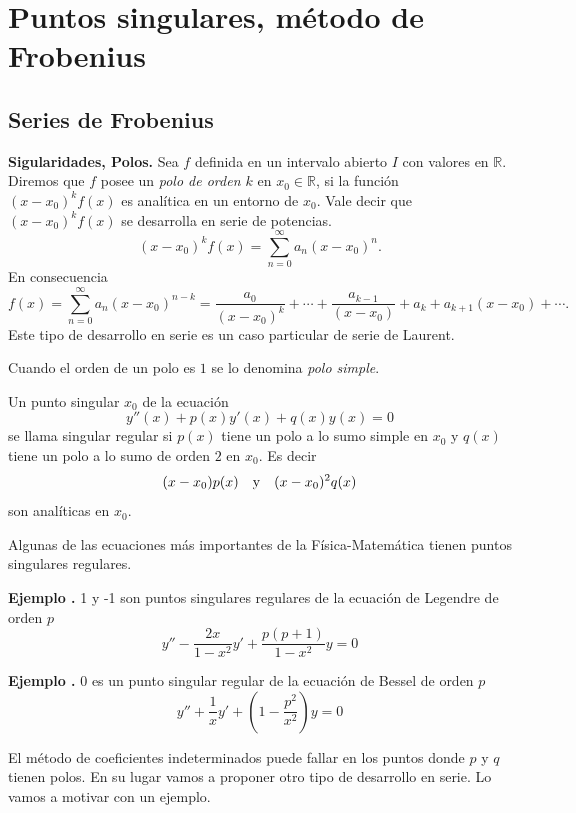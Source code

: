 \documentclass{article}
\newcommand{\rr}{\mathbb{R}}
\newcounter{ejemplo_cont}
\newenvironment{ejemplo}{\noindent\textbf{Ejemplo  \arabic{ejemplo_cont}.} }{\addtocounter{ejemplo_cont}{1}}
\begin{document}
\section{Puntos singulares, método de Frobenius}

\subsection{Series de Frobenius}
\begin{definicion}\textbf{ Sigularidades, Polos.} Sea $f$ definida en un intervalo abierto $I$ con valores en $\rr$. Diremos que $f$ posee un \emph{polo de orden $k$} en $x_0\in\rr$, si la función $(x-x_0)^kf(x)$ es analítica en un entorno de $x_0$. Vale decir que $(x-x_0)^kf(x)$ se desarrolla en serie de potencias.
\[(x-x_0)^kf(x)=\sum_{n=0}^{\infty}a_n(x-x_0)^n.\]
En consecuencia
\[f(x)=\sum_{n=0}^{\infty}a_n(x-x_0)^{n-k}=\frac{a_0}{(x-x_0)^k}+\cdots+\frac{a_{k-1}}{(x-x_0)}+a_k+a_{k+1}(x-x_0)+\cdots.\]
Este tipo de desarrollo en serie es un caso particular de serie de Laurent. 

Cuando el orden de un polo es $1$ se lo denomina \emph{polo simple}.
\end{definicion}



\begin{definicion} Un punto singular $x_0$ de la ecuación
\[y''(x)+p(x)y'(x)+q(x)y(x)=0\]
se llama singular regular si $p(x)$ tiene un polo a lo sumo simple en $x_0$ y $q(x)$ tiene un polo a lo sumo de orden $2$ en $x_0$. Es decir
\[(x-x_0)p(x)\quad\hbox{y}\quad (x-x_0)^2q(x)\]
son analíticas en $x_0$.
\end{definicion}
Algunas de las ecuaciones más importantes de la Física-Matemática tienen puntos singulares regulares.

\begin{ejemplo} 1 y -1 son puntos singulares regulares de la ecuación de Legendre de orden $p$
\[y''-\frac{2x}{1-x^2}y'+\frac{p(p+1)}{1-x^2}y=0\]
\end{ejemplo}


\begin{ejemplo} 0 es un punto singular regular de la ecuación de Bessel de orden $p$
\[y''+\frac{1}{x}y'+\left(1-\frac{p^2}{x^2}\right)y=0\]
\end{ejemplo}

El método de coeficientes indeterminados puede fallar en los puntos donde $p$ y $q$ tienen polos. En su lugar vamos a proponer otro tipo de desarrollo en serie. Lo vamos a motivar con un ejemplo.
\end{document}

